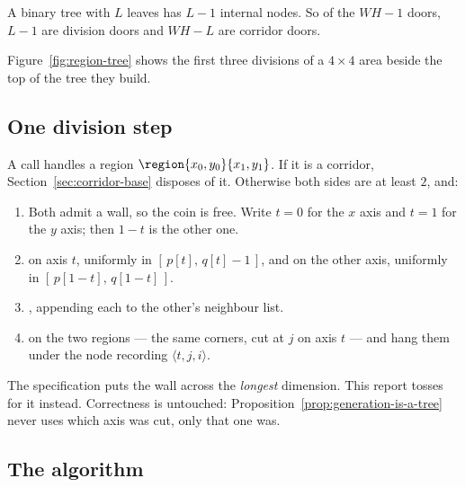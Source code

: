 A binary tree with $L$ leaves has $L-1$ internal nodes. So of the $WH-1$ doors,
$L-1$ are division doors and $WH-L$ are corridor doors.

Figure~\ref{fig:region-tree} shows the first three divisions of a $4\times4$
area beside the top of the tree they build.



\subsection{One division step}

A call handles a region $\region{x_0,y_0}{x_1,y_1}$. If it is a corridor,
Section~\ref{sec:corridor-base} disposes of it. Otherwise both sides are at
least $2$, and:

\begin{enumerate}[leftmargin=*,itemsep=4pt]
  \item {} Both admit a wall, so the coin
        is free. Write $t=0$ for the $x$ axis and $t=1$ for the $y$ axis; then
        $1-t$ is the other one.
  \item {} on axis $t$, uniformly in
        $[\,p[t],\,q[t]-1\,]$, and  on the other
        axis, uniformly in $[\,p[1-t],\,q[1-t]\,]$.
  \item {}, appending each to the
        other's neighbour list.
  \item {} on the two regions --- the same corners, cut at $j$ on
        axis $t$ --- and hang them under the node recording $\langle
        t,j,i\rangle$.
\end{enumerate}

\begin{remark}
The specification puts the wall across the \emph{longest} dimension. This report
tosses for it instead. Correctness is untouched:
Proposition~\ref{prop:generation-is-a-tree} never uses which axis was cut, only
that one was.
\end{remark}



\subsection{The algorithm}


